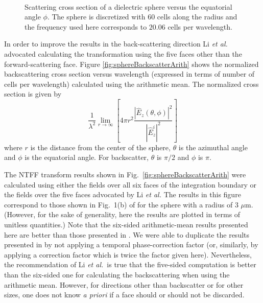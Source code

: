 \begin{figure}
\centering
{}\\
\caption{Scattering cross section of a dielectric sphere versus the
equatorial angle $\phi$.  The sphere is discretized with $60$ cells
along the radius and the frequency used here corresponds to $20.06$
cells per wavelength.}
\label{fig:sphereVsPhi}
\end{figure}

In order to improve the results in the back-scattering direction Li
{\em et al.}\ \cite{li2005a2} advocated calculating the transformation
using the five faces other than the forward-scattering face.  Figure
\ref{fig:sphereBackscatterArith} shows the normalized backscattering
cross section versus wavelength (expressed in terms of number of cells
per wavelength) calculated using the arithmetic mean.  The normalized
cross section is given by
\begin{equation}
  \frac{1}{\lambda^2}\lim_{r\rightarrow\infty}
   \left[4\pi r^2\frac{|\hat{E}_z(\theta,\phi)|^2}{|\hat{E}_z^i|^2}\right]
  \label{eq:crossSection}
\end{equation}
where $r$ is the distance from the center of the sphere, $\theta$ is
the azimuthal angle and $\phi$ is the equatorial angle.  For
backscatter, $\theta$ is $\pi/2$ and $\phi$ is $\pi$.

The NTFF transform results shown in Fig.\
\ref{fig:sphereBackscatterArith} were calculated using either the
fields over all six faces of the integration boundary or the fields
over the five faces advocated by Li {\em et al.}  The results in this
figure correspond to those shown in Fig.\ 1(b) of \cite{li2005a2} for
the sphere with a radius of $3$ $\mu$m.  (However, for the sake of
generality, here the results are plotted in terms of unitless
quantities.)  Note that the six-sided arithmetic-mean results
presented here are better than those presented in \cite{li2005a2}.  We
were able to duplicate the results presented in \cite{li2005a2} by not
applying a temporal phase-correction factor (or, similarly, by
applying a correction factor which is twice the factor given here).
Nevertheless, the recommendation of Li {\em et al.}\ is true that the
five-sided computation is better than the six-sided one for
calculating the backscattering when using the arithmetic mean.
However, for directions other than backscatter or for other sizes, one
does not know {\em a priori} if a face should or should not be
discarded.

